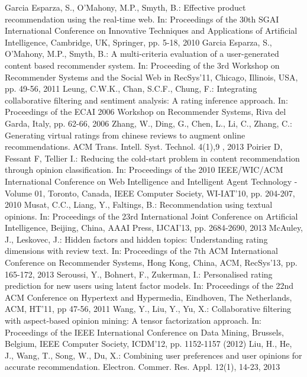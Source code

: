 \documentclass[a4paper,11pt,oneside,openany]{jsbook}
\begin{document}
\begin{thebibliography}{99}
	 Garcia Esparza, S., O’Mahony, M.P., Smyth, B.: Effective product recommendation using the real-time web. In: Proceedings of the 30th SGAI International Conference on Innovative Techniques and Applications of Artificial Intelligence, Cambridge, UK, Springer, pp. 5-18, 2010
	 Garcia Esparza, S., O’Mahony, M.P., Smyth, B.: A multi-criteria evaluation of a user-generated content based recommender system. In: Proceeding of the 3rd Workshop on Recommender Systems and the Social Web in RecSys’11, Chicago, Illinois, USA, pp. 49-56, 2011
	 Leung, C.W.K., Chan, S.C.F., Chung, F.: Integrating collaborative filtering and sentiment analysis: A rating inference approach. In: Proceedings of the ECAI 2006 Workshop on Recommender Systems, Riva del Garda, Italy, pp. 62-66, 2006
	 Zhang, W., Ding, G., Chen, L., Li, C., Zhang, C.: Generating virtual ratings from chinese reviews to augment online recommendations. ACM Trans. Intell. Syst. Technol. 4(1),9 , 2013
	Poirier D, Fessant F, Tellier I.: Reducing the cold-start problem in content recommendation through opinion classification. In: Proceedings of the 2010 IEEE/WIC/ACM International Conference on Web Intelligence and Intelligent Agent Technology - Volume 01, Toronto, Canada, IEEE Computer Society, WI-IAT’10, pp. 204-207, 2010
	Musat, C.C., Liang, Y., Faltings, B.: Recommendation using textual opinions. In: Proceedings of the 23rd International Joint Conference on Artificial Intelligence, Beijing, China, AAAI Press, IJCAI’13, pp. 2684-2690, 2013
	McAuley, J., Leskovec, J.: Hidden factors and hidden topics: Understanding rating dimensions with review text. In: Proceedings of the 7th ACM International Conference on Recommender Systems, Hong Kong, China, ACM, RecSys’13, pp. 165-172, 2013
	Seroussi, Y., Bohnert, F., Zukerman, I.: Personalised rating prediction for new users using latent factor models. In: Proceedings of the 22nd ACM Conference on Hypertext and Hypermedia, Eindhoven, The Netherlands, ACM, HT’11, pp 47-56, 2011
	Wang, Y., Liu, Y., Yu, X.: Collaborative filtering with aspect-based opinion mining: A tensor factorization approach. In: Proceedings of the IEEE International Conference on Data Mining, Brussels, Belgium, IEEE Computer Society, ICDM’12, pp. 1152-1157 (2012)
	Liu, H., He, J., Wang, T., Song, W., Du, X.: Combining user preferences and user opinions for accurate recommendation. Electron. Commer. Res. Appl. 12(1), 14-23, 2013

\end{thebibliography}
\end{document}
